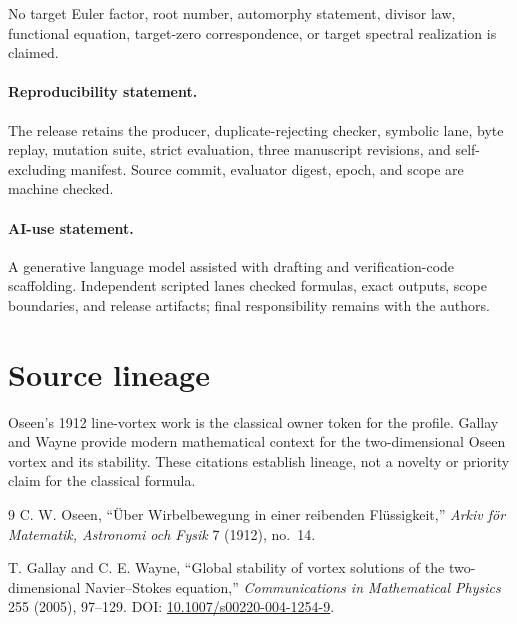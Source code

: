 \documentclass[10pt]{article}
\begin{document}
No target Euler factor, root number, automorphy statement, divisor law,
functional equation, target-zero correspondence, or target spectral
realization is claimed.

\paragraph{Reproducibility statement.}
The release retains the producer, duplicate-rejecting checker, symbolic lane,
byte replay, mutation suite, strict evaluation, three manuscript revisions,
and self-excluding manifest.  Source commit, evaluator digest, epoch, and
scope are machine checked.

\paragraph{AI-use statement.}
A generative language model assisted with drafting and verification-code
scaffolding.  Independent scripted lanes checked formulas, exact outputs,
scope boundaries, and release artifacts; final responsibility remains with
the authors.
\fi

\section*{Source lineage}
Oseen's 1912 line-vortex work is the classical owner token for the profile.
Gallay and Wayne provide modern mathematical context for the two-dimensional
Oseen vortex and its stability.  These citations establish lineage, not a
novelty or priority claim for the classical formula.

\begin{thebibliography}{9}
C. W. Oseen, ``Über Wirbelbewegung in einer reibenden Flüssigkeit,''
\emph{Arkiv för Matematik, Astronomi och Fysik} 7 (1912), no.~14.

T. Gallay and C. E. Wayne, ``Global stability of vortex solutions of the
two-dimensional Navier--Stokes equation,''
\emph{Communications in Mathematical Physics} 255 (2005), 97--129.
DOI: \href{https://doi.org/10.1007/s00220-004-1254-9}{10.1007/s00220-004-1254-9}.
\end{thebibliography}
\end{document}
